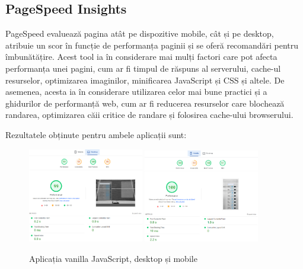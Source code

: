 \documentclass[12pt, a4paper]{report}
\begin{document}
\subsection{PageSpeed Insights}

PageSpeed evaluează pagina atât pe dispozitive mobile, cât și pe desktop, atribuie un scor în funcție de performanța paginii și se oferă recomandări pentru îmbunătățire. Acest tool ia în considerare mai mulți factori care pot afecta performanța unei pagini, cum ar fi timpul de răspuns al serverului, cache-ul resurselor, optimizarea imaginilor, minificarea JavaScript și CSS și altele. De asemenea, acesta ia în considerare utilizarea celor mai bune practici și a ghidurilor de performanță web, cum ar fi reducerea resurselor care blochează randarea, optimizarea căii critice de randare și folosirea cache-ului browserului.

Rezultatele obținute pentru ambele aplicații sunt:

\begin{figure}[htbp]
	\centering
	\includegraphics[width=0.45\textwidth]{01_desktop_pagespeed.png}
	\includegraphics[width=0.45\textwidth]{01_mobile_pagespeed.png}
	\caption{Aplicația vanilla JavaScript, desktop și mobile}
	\label{fig:01-deployed-pagespeed}
\end{figure}
\end{document}
